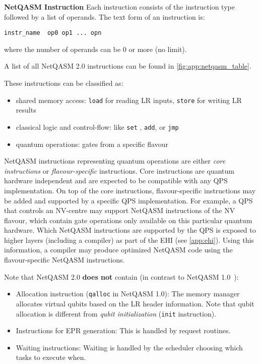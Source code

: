 \textbf{NetQASM Instruction}
Each instruction consists of the instruction type followed by a list of operands.
The text form of an instruction is:

\begin{lstlisting}
instr_name  op0 op1 ... opn
\end{lstlisting}

where the number of operands can be 0 or more (no limit).

A list of all NetQASM 2.0 instructions can be found in \cref{fig:app:netqasm_table}.

These instructions can be classified as:
\begin{itemize}
\item shared memory access: \texttt{load} for reading LR inputs, \texttt{store} for writing LR results
\item classical logic and control-flow: like \texttt{set} , \texttt{add}, or \texttt{jmp}
\item quantum operations: gates from a specific flavour~\cite{dahlberg2022netqasm}
\end{itemize}

NetQASM instructions representing quantum operations are either \textit{core instructions} or \textit{flavour-specific} instructions.
Core instructions are quantum hardware independent and are expected to be compatible with any QPS implementation. On top of the core instructions, flavour-specific instructions may be added and supported by a specific QPS implementation. For example, a QPS that controls an NV-centre may support NetQASM instructions of the NV flavour, which contain gate operations only available on this particular quantum hardware. Which NetQASM instructions are supported by the QPS is exposed to higher layers (including a compiler) as part of the EHI (see \cref{app:ehi}). Using this information, a compiler may produce optimized NetQASM code using the flavour-specific NetQASM instructions.


Note that NetQASM 2.0 \textbf{does not} contain (in contrast to NetQASM 1.0~\cite{dahlberg2022netqasm}):
\begin{itemize}
\item Allocation instruction (\texttt{qalloc} in NetQASM 1.0): The memory manager allocates virtual qubits based on the LR header information. Note that qubit allocation is different from \textit{qubit initialization} (\texttt{init} instruction).
\item Instructions for EPR generation: This is handled by request routines.
\item Waiting instructions: Waiting is handled by the scheduler choosing which tasks to execute when.
\end{itemize}

